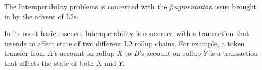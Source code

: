 The Interoperability problems is concerned with the \emph{fragmentation} issue brought in by the advent of L2s. 

In its most basic essence, Interoperability is concerned with a transaction that intends to affect state of two different L2 rollup chains. For example, a token transfer from $A$'s account on rollup $X$ to $B$'s account on rollup $Y$ is a transaction that affects the state of both $X$ and $Y$.